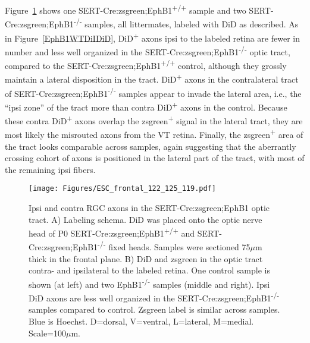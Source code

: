 Figure~\ref{ESCfrontal} shows one SERT-Cre:zsgreen;EphB1\textsuperscript{+/+} sample and two SERT-Cre:zsgreen;EphB1\textsuperscript{-/-} samples, all littermates, labeled with DiD as described.
As in Figure~\ref{EphB1WTDiIDiD}, DiD\textsuperscript{+} axons ipsi to the labeled retina are fewer in number and less well organized in the SERT-Cre:zsgreen;EphB1\textsuperscript{-/-} optic tract, compared to the SERT-Cre:zsgreen;EphB1\textsuperscript{+/+} control, although they grossly maintain a lateral disposition in the tract.
DiD\textsuperscript{+} axons in the contralateral tract of SERT-Cre:zsgreen;EphB1\textsuperscript{-/-} samples appear to invade the lateral area, i.e., the ``ipsi zone'' of the tract more than contra DiD\textsuperscript{+} axons in the control.
Because these contra DiD\textsuperscript{+} axons overlap the zsgreen\textsuperscript{+} signal in the lateral tract, they are most likely the misrouted axons from the VT retina.
Finally, the zsgreen\textsuperscript{+} area of the tract looks comparable across samples, again suggesting that the aberrantly crossing cohort of axons is positioned in the lateral part of the tract, with most of the remaining ipsi fibers.
\begin{figure}[hbtp]
    \begin{center}
        \texttt{[image: Figures/ESC\_frontal\_122\_125\_119.pdf]}
        \caption[Ipsi and contra RGC axons in the SERT-Cre:zsgreen;EphB1 optic tract.]
        {Ipsi and contra RGC axons in the SERT-Cre:zsgreen;EphB1 optic tract.
        A) Labeling schema.
        DiD was placed onto the optic nerve head of P0 SERT-Cre:zsgreen;EphB1\textsuperscript{+/+} and SERT-Cre:zsgreen;EphB1\textsuperscript{-/-} fixed heads.
        Samples were sectioned 75$\mu$m thick in the frontal plane.
        B) DiD and zsgreen in the optic tract contra- and ipsilateral to the labeled retina.
        One control sample is shown (at left) and two EphB1\textsuperscript{-/-} samples (middle and right).
        Ipsi DiD axons are less well organized in the SERT-Cre:zsgreen;EphB1\textsuperscript{-/-} samples compared to control.
        Zsgreen label is similar across samples.
        Blue is Hoechst.
        D=dorsal, V=ventral, L=lateral, M=medial.
        Scale=100$\mu$m.}
        \label{ESCfrontal}
    \end{center}
\end{figure}

